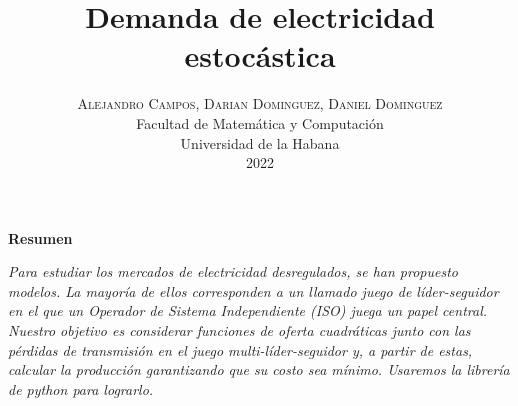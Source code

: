 \documentclass[twoside]{article}
\title{\vspace{-0.5cm}\fontsize{20pt}{10pt}\selectfont\textbf{Demanda de electricidad estoc\'astica}}
\author{
\large
\textsc{\vspace{-3cm} Alejandro Campos, Darian Dominguez, Daniel Dominguez}\\[4.5cm]
\normalsize Facultad de Matem\'atica y Computaci\'on \\
\normalsize Universidad de la Habana \\
\normalsize 2022 \\[1cm]
\vspace{-5mm}
}
\date{}
\begin{document}
\maketitle

\thispagestyle{fancy} 

\begin{center}
\textbf{Resumen}
\end{center}
\noindent \textit{Para estudiar los mercados de electricidad desregulados, se han propuesto modelos. La mayor\'ia de ellos corresponden a un llamado juego de l\'ider-seguidor en el que un Operador de Sistema Independiente (ISO) juega un papel central. Nuestro objetivo es considerar funciones de oferta cuadr\'aticas junto con las p\'erdidas de transmisi\'on en el juego multi-l\'ider-seguidor y, a partir de estas, calcular la producci\'on garantizando que su costo sea m\'inimo. Usaremos la librer\'ia de python  para lograrlo.}\\[0.5cm]
\end{document}
